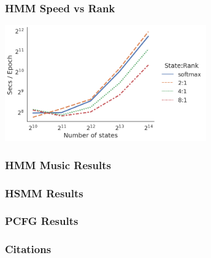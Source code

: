 \documentclass{beamer}
\begin{document}
\begin{frame}
\frametitle{HMM Speed vs Rank}
\begin{center}
\includegraphics[height=5cm]{imgs/hmm/lhmm-states-features-speed.png}
\end{center}
\end{frame}

\begin{frame}
\frametitle{HMM Music Results}
\end{frame}

\begin{frame}
\frametitle{HSMM Results}
\end{frame}

\begin{frame}
\frametitle{PCFG Results}
\end{frame}

\begin{frame}
\frametitle{Citations}
\printbibliography
\end{frame}
\end{document}
